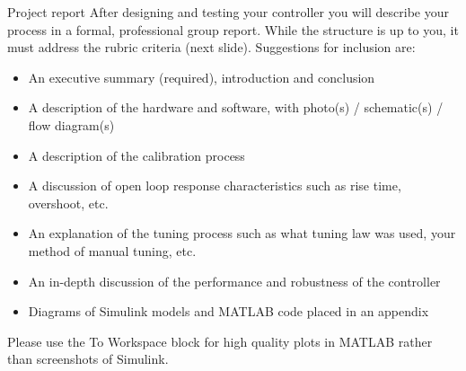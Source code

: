 \documentclass[9pt]{beamer-control}
\begin{document}
\begin{frame}{Project report}
	After designing and testing your controller you will describe your process in a formal, professional group report. While the structure is up to you, it must address the rubric criteria (next slide). Suggestions for inclusion are:
	\begin{itemize}
		\item An executive summary (required), introduction and conclusion
		\item A description of the hardware and software, with photo(s) / schematic(s) / flow diagram(s)
		\item A description of the calibration process
		\item A discussion of open loop response characteristics such as rise time, overshoot, etc.
		\item An explanation of the tuning process such as what tuning law was used, your method of manual tuning, etc.
		\item An in-depth discussion of the performance and robustness of the controller
		\item Diagrams of Simulink models and MATLAB code placed in an appendix
	\end{itemize}
	Please use the \textsf{To Workspace} block for high quality plots in MATLAB rather than screenshots of Simulink.
\end{frame}
\end{document}

